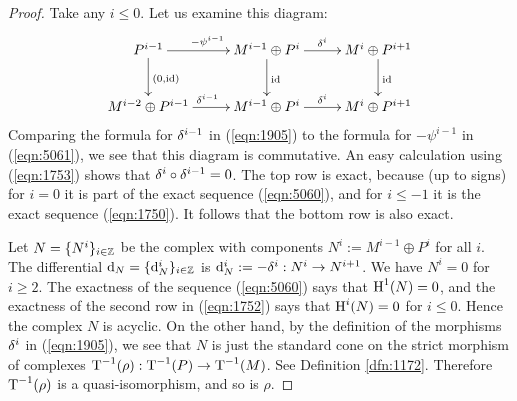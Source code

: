 \begin{proof}
Take any $i \leq 0$. Let us examine this diagram: 
\begin{equation} \label{eqn:1752}
\UseTips \xymatrix @C=6ex @R=6ex {
P^{i - 1}
\ar[r]^{- \psi^{i - 1}}
\ar[d]^{(0, \opn{id})}
&
M^{i - 1} \oplus P^{i}
\ar[r]^{\de^{i}}
\ar[d]^{\opn{id}}
&
M^{i} \oplus P^{i + 1}
\ar[d]^{\opn{id}}
\\
M^{i - 2} \oplus P^{i - 1}
\ar[r]^{\de^{i - 1}}
&
M^{i - 1} \oplus P^{i}
\ar[r]^{\de^{i}}
&
M^i \oplus P^{i+ 1}
}
\end{equation}
Comparing the formula for $\delta^{i - 1}$ in (\ref{eqn:1905}) to the 
formula for $- \psi^{i - 1}$ in (\ref{eqn:5061}), we see that this diagram is 
commutative. 
An easy calculation using (\ref{eqn:1753}) shows that 
$\delta^{i} \circ \delta^{i - 1} = 0$. 
The top row is exact, because (up to signs) for $i = 0$ it is part of the 
exact sequence (\ref{eqn:5060}), and  for $i \leq -1$ it is the exact sequence 
(\ref{eqn:1750}). 
It follows that the bottom row is also exact.

Let $N =  \{ N^i \}_{i \in \mathbb{Z}}$ be the complex with  components 
$N^i := M^{i - 1} \oplus P^{i}$ for all $i$. 
The differential
$\mathrm{d}_N= \{ \mathrm{d}_N^{i} \}_{i \in \mathbb{Z}}$
is $\mathrm{d}^i_N := -\delta^{i} : N^i \to N^{i + 1}$.
We have $N^i = 0$ for $i \geq 2$. 
The exactness of the sequence (\ref{eqn:5060}) says that 
$\operatorname{H}^1(N) = 0$, and the exactness of the second row in 
(\ref{eqn:1752}) says that $\operatorname{H}^i(N) = 0$ for $i \leq 0$. 
Hence the complex $N$ is acyclic. 
On the other hand, by the definition of the morphisms 
$\delta^i$ in (\ref{eqn:1905}), we see that $N$ is just the standard cone on the 
strict morphism of complexes
$\operatorname{T}^{-1}(\rho) : \operatorname{T}^{-1}(P) \to \operatorname{T}^{-1}(M)$.
See Definition \ref{dfn:1172}. 
Therefore $\operatorname{T}^{-1}(\rho)$ is a quasi-isomorphism, and so is $\rho$.
\end{proof}


